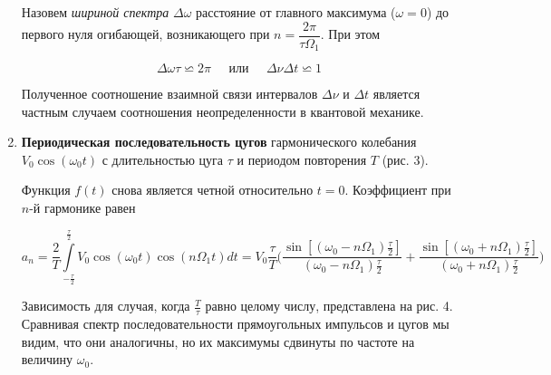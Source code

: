 \documentclass[12pt,a4paper]{article}
\begin{document}
\begin{enumerate}
	
	Назовем \textit{шириной спектра} $\Delta \omega$ расстояние от главного максимума ($\omega =0$) до первого нуля огибающей, возникающего при $n=\dfrac{2\pi}{\tau \Omega_{1}}$. При этом 

\begin{equation}\label{neopr}
	\Delta \omega \tau \backsimeq 2 \pi \;\;\;\;\; \text{или} \;\;\;\;\;
	\Delta \nu \Delta t \backsimeq 1
\end{equation}
		
	Полученное соотношение взаимной связи интервалов $\Delta \nu$ и $\Delta t$ является
	частным случаем соотношения неопределенности в квантовой механике.
	
	\item \textbf{Периодическая последовательность цугов} гармонического колебания $V_{0}\cos(\omega_{0}t)$ с длительностью цуга $\tau$ и периодом повторения $T$ (рис. 3).
	
	Функция $f(t)$ снова является четной относительно $t=0$. Коэффициент при $n$-й гармонике равен
	
	$$a_{n}=\dfrac{2}{T}\int\limits_{-\frac{\tau}{2}}^{\frac{\tau}{2}}V_{0}\cos(\omega_{0}t)\cos(n \Omega_{1} t)dt=V_{0}\dfrac{\tau}{T} \bigg(\dfrac{\sin[(\omega_{0}-n\Omega_{1})\frac{\tau}{2}]}{(\omega_{0}-n\Omega_{1})\frac{\tau}{2}}+\dfrac{\sin[(\omega_{0}+n\Omega_{1})\frac{\tau}{2}]}{(\omega_{0}+n\Omega_{1})\frac{\tau}{2}} \bigg)$$ 
	
	Зависимость для случая, когда $\frac{T}{\tau}$ равно целому числу, представлена на рис. 4. Сравнивая спектр последовательности прямоугольных импульсов и цугов мы видим, что они аналогичны, но их максимумы сдвинуты по частоте на величину $\omega_{0}$.
	

\end{enumerate}
\end{document}
